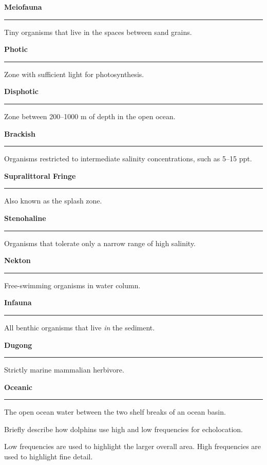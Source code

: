 \documentclass[11pt]{exam}
\newcommand*\Matching[1]{
\ifprintanswers
	\textbf{#1}
\else
	\rule{2.1in}{0.5pt}
\fi
}
\newlength\matchlena
\newlength\matchlenb
\newcommand\MatchQuestion[2]{%
	\setlength\matchlenb{\linewidth}
	\addtolength\matchlenb{-\matchlena}
	\parbox[t]{\matchlena}{\Matching{#1}}\enspace\parbox[t]{\matchlenb}{#2}}
\begin{document}
\begin{questions}

\vspace{-1\baselineskip}
\fullwidth{%

}
\vspace{0.7\baselineskip}

\question\MatchQuestion{Meiofauna}{Tiny organisms that live in the spaces between sand grains.}
\vspace{0.7\baselineskip}

\question\MatchQuestion{Photic}{Zone with sufficient light for photosynthesis.}
\vspace{0.7\baselineskip}

\question\MatchQuestion{Disphotic}{Zone between 200--1000 m of depth in the open ocean.}
\vspace{0.7\baselineskip}

\question\MatchQuestion{Brackish}{Organisms restricted to intermediate salinity concentrations, such as 5--15 ppt.}
\vspace{0.7\baselineskip}

\question\MatchQuestion{Supralittoral Fringe}{Also known as the splash zone.}
\vspace{0.7\baselineskip}

\question\MatchQuestion{Stenohaline}{Organisms that tolerate only a narrow range of high salinity.}
\vspace{0.7\baselineskip}

\question\MatchQuestion{Nekton}{Free-swimming organisms in water column.}
\vspace{0.7\baselineskip}

\question\MatchQuestion{Infauna}{All benthic organisms that live \emph{in} the sediment.}
\vspace{0.7\baselineskip}

\question\MatchQuestion{Dugong}{Strictly marine mammalian herbivore.}
\vspace{0.7\baselineskip}

\question\MatchQuestion{Oceanic}{The open ocean water between the two shelf breaks of an ocean basin.}
\vspace{0.7\baselineskip}


\newpage

\question[4]
Briefly describe how dolphins use high and low frequencies for echolocation.
	\begin{solution}
	Low frequencies are used to highlight the larger overall area. High frequencies are used to highlight fine detail.
	\end{solution}


\end{questions}
\end{document}
